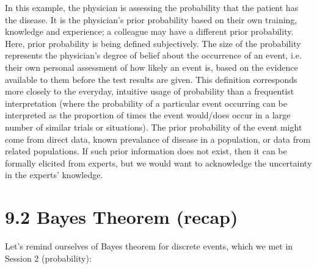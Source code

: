 \documentclass[letterpaper,10pt,english]{jupyterBook}
\let\sphinxpxdimen\pdfpxdimen\else\newdimen\sphinxpxdimen
\begin{document}
\begin{figure}[htbp]
\centering

\noindent\sphinxincludegraphics[height=300\sphinxpxdimen]{{Physician}.png}
\end{figure}

\sphinxAtStartPar
In this example, the physician is assessing the probability that the patient has the disease. It is the physician’s prior probability based on their own training, knowledge and experience; a colleague may have a different prior probability. Here, prior probability is being defined subjectively. The size of the probability represents the physician’s degree of belief about the occurrence of an event, i.e. their own personal assessment of how likely an event is, based on the evidence available to them before the test results are given. This definition corresponds more closely to the everyday, intuitive  usage of probability than a frequentist interpretation (where the probability of a particular event occurring can be interpreted as the proportion of times the event would/does occur in a large number of similar trials or situations). The prior probability of the event might come from direct data, known prevalance of disease in a population, or data from related populations. If such prior information does not exist, then it can be formally elicited from experts, but we would want to acknowledge the uncertainty in the experts’ knowledge.


\section{9.2 Bayes Theorem (recap)}
\label{\detokenize{09.c. Bayesian Statistics I:bayes-theorem-recap}}\label{\detokenize{09.c. Bayesian Statistics I::doc}}
\sphinxAtStartPar
Let’s remind ourselves of Bayes theorem for discrete events, which we met in Session 2 (probability):
\end{document}
